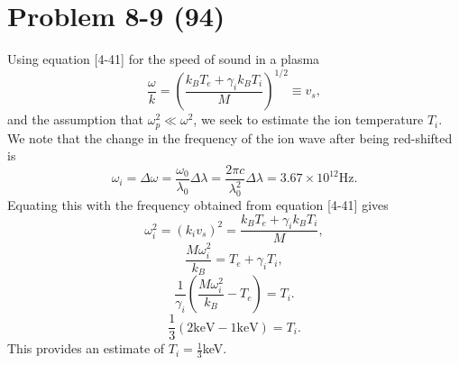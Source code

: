 \section*{Problem 8-9 (94)}
\label{sec:8-9}
Using equation [4-41] for the speed of sound in a plasma
\begin{equation*}
	\dfrac{\omega}{k} = \left(\dfrac{k_BT_e + \gamma_ik_BT_i}{M}\right)^{1/2} \equiv v_s,
\end{equation*}
and the assumption that \(\omega^2_p \ll \omega^2 \), we seek to estimate the ion temperature \(T_i\). We note that the change in the frequency of the ion wave after being red-shifted is
\begin{equation*}
	\omega_i = \Delta\omega = \dfrac{\omega_0}{\lambda_0}\Delta\lambda  = \dfrac{2\pi c}{\lambda^2_0}\Delta\lambda = 3.67\times 10^{12}\text{Hz}.
\end{equation*}
Equating this with the frequency obtained from equation [4-41] gives
\begin{equation*}
	\omega_i^2 = (k_iv_s)^2 = \dfrac{k_BT_e + \gamma_ik_BT_i}{M},
\end{equation*}
\begin{equation*}
	\dfrac{M\omega_i^2}{k_B} = T_e + \gamma_iT_i,
\end{equation*}
\begin{equation*}
	\dfrac{1}{\gamma_i}\left(\dfrac{M\omega_i^2}{k_B} - T_e\right) = T_i.
\end{equation*}
\begin{equation*}
	\dfrac{1}{3}\left(2\text{keV} - 1\text{keV}\right) = T_i.
\end{equation*}
This provides an estimate of \(T_i = \frac{1}{3}\)keV.

